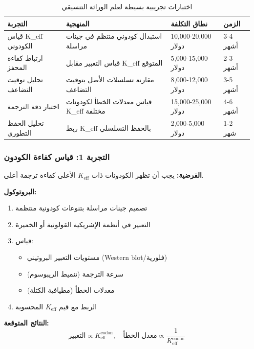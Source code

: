 \documentclass[11pt,a4paper]{article}
\begin{document}
	\begin{table}[H]
		\centering
		\caption{اختبارات تجريبية بسيطة لعلم الوراثة التنسيقي}
		\begin{tabular}{p{4cm}p{5cm}p{3cm}p{2cm}}
			\toprule
			\textbf{التجربة} & \textbf{المنهجية} & \textbf{نطاق التكلفة} & \textbf{الزمن} \\
			\midrule
			قياس K\_eff الكودوني & استبدال كودوني منتظم في جينات مراسلة & 10,000-20,000 دولار & 3-4 أشهر \\
			ارتباط كفاءة المحفز & قياس التعبير مقابل K\_eff المتوقع & 5,000-15,000 دولار & 2-3 أشهر \\
			تحليل توقيت التضاعف & مقارنة تسلسلات الأصل بتوقيت التضاعف & 8,000-12,000 دولار & 3-5 أشهر \\
			اختبار دقة الترجمة & قياس معدلات الخطأ لكودونات K\_eff مختلفة & 15,000-25,000 دولار & 4-6 أشهر \\
			تحليل الحفظ التطوري & ربط K\_eff بالحفظ التسلسلي & 2,000-5,000 دولار & 1-2 شهر \\
			\bottomrule
		\end{tabular}
	\end{table}
	
	\subsubsection{التجربة 1: قياس كفاءة الكودون}
	\textbf{الفرضية:} يجب أن تظهر الكودونات ذات $K_{\text{eff}}$ الأعلى كفاءة ترجمة أعلى.
	
	\textbf{البروتوكول:}
	\begin{enumerate}
		\item تصميم جينات مراسلة بتنوعات كودونية منتظمة
		\item التعبير في أنظمة الإشريكية القولونية أو الخميرة
		\item قياس:
		\begin{itemize}
			\item مستويات التعبير البروتيني (Western blot/فلورية)
			\item سرعة الترجمة (تنميط الريبوسوم)
			\item معدلات الخطأ (مطيافية الكتلة)
		\end{itemize}
		\item الربط مع قيم $K_{\text{eff}}$ المحسوبة
	\end{enumerate}
	
	\textbf{النتائج المتوقعة:}
	\[
	\text{التعبير} \propto K_{\text{eff}}^{\text{codon}}, \quad \text{معدل الخطأ} \propto \frac{1}{K_{\text{eff}}^{\text{codon}}}
	\]
	
\end{document}
